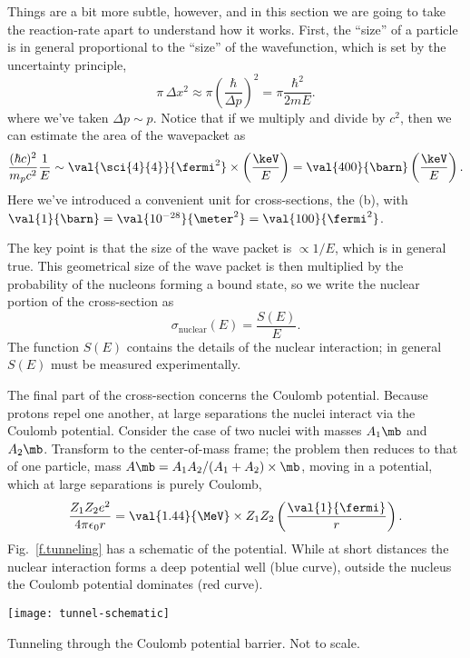  Things are a bit more subtle, however, and in this section we are going to take the reaction-rate apart to understand how it works. First, the ``size'' of a particle is in general proportional to the ``size'' of the wavefunction, which is set by the uncertainty principle, 
\[\pi\,\Delta x^{2} \approx \pi \left(\frac{\hbar}{\Delta p}\right)^{2} = \pi\frac{\hbar^{2}}{2mE}.\]
where we've taken $\Delta p\sim p$.
Notice that if we multiply and divide by $c^{2}$, then we can estimate the area of the wavepacket as
\[
	\frac{(\hbar c)^{2}}{m_{p} c^{2}} \frac{1}{E} \sim \val{\sci{4}{4}}{\fermi^{2}} \times \left(\frac{\keV}{E}\right) = \val{400}{\barn}\left(\frac{\keV}{E}\right).
\]	
Here we've introduced a convenient unit for cross-sections, the  (b), with $\val{1}{\barn} = \val{10^{-28}}{\meter^{2}} = \val{100}{\fermi^{2}}$.

The key point is that the size of the wave packet is $\propto 1/E$, which is in general true. This geometrical size of the wave packet is then multiplied by the probability of the nucleons forming a bound state, so we write the nuclear portion of the cross-section as
\[
	\sigma_{\mathrm{nuclear}}(E) = \frac{S(E)}{E}.
\]
The function $S(E)$ contains the details of the nuclear interaction; in general $S(E)$ must be measured experimentally.

The final part of the cross-section concerns the Coulomb potential.
Because protons repel one another, at large separations the nuclei interact via the Coulomb potential. Consider the case of two nuclei with masses $A_{1}\mb$ and $A_{2}\mb$. Transform to the center-of-mass frame; the problem then reduces to that of one particle, mass $A\mb = A_{1}A_{2}/(A_{1}+A_{2})\times\mb$, moving in a potential, which at large separations is purely Coulomb,
\[ \frac{Z_{1}Z_{2}e^{2}}{4\pi\epsilon_{0}r} = \val{1.44}{\MeV}\times Z_{1}Z_{2}\left(\frac{\val{1}{\fermi}}{r}\right). \]
Fig.~\ref{f.tunneling} has a schematic of the potential. While at short distances the nuclear interaction forms a deep potential well (blue curve), outside the nucleus the Coulomb potential dominates (red curve).
\begin{marginfigure}
\texttt{[image: tunnel-schematic]}
\caption{Tunneling through the Coulomb potential barrier. Not to scale.}
\label{f.tunneling}
\end{marginfigure}


